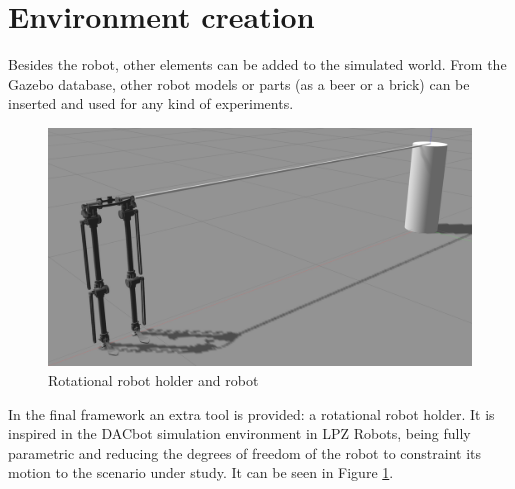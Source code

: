 \section{Environment creation} %
\label{sec:environment_creation}
Besides the robot, other elements can be added to the simulated world.
From the Gazebo database, other robot models or parts (as a beer or a brick) can be inserted and used for any kind of experiments.

\begin{figure}[hb!]
  \centering
  \includegraphics[width=0.75\linewidth]{figures/gazebo_rotational_holder}
  \caption{Rotational robot holder and robot}
  \label{fig:rotational_robot_holder}
\end{figure}

\hfill

In the final framework an extra tool is provided: a rotational robot holder.
It is inspired in the DACbot simulation environment in LPZ Robots, being fully parametric and reducing the degrees of freedom of the robot to constraint its motion to the scenario under study.
It can be seen in Figure \ref{fig:rotational_robot_holder}.

